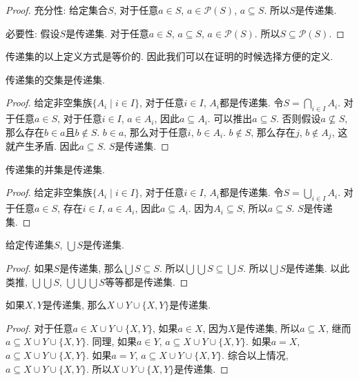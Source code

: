 \begin{proof}
	充分性: 给定集合$S$, 对于任意$a\in S$, $a\in \mathscr P(S)$, $a\subseteq S$. 所以$S$是传递集.
	
	必要性: 假设$S$是传递集. 对于任意$a\in S$, $a\subseteq S$, $a\in \mathscr P(S)$. 所以$S\subseteq \mathscr P(S)$.
\end{proof}

传递集的以上定义方式是等价的. 因此我们可以在证明的时候选择方便的定义.

\begin{proposition}
	传递集的交集是传递集.
\end{proposition}

\begin{proof}
	给定非空集族$\{A_i\mid i\in I\}$, 对于任意$i\in I$, $A_i$都是传递集. 令$S=\bigcap_{i\in I} A_i$. 对于任意$a\in S$, 对于任意$i\in I$, $a\in A_i$, 因此$a\subseteq A_i$. 可以推出$a\subseteq S$. 否则假设$a\nsubseteq S$, 那么存在$b\in a$且$b\notin S$. $b\in a$, 那么对于任意$i$, $b\in A_i$. $b\notin S$, 那么存在$j$, $b\notin A_j$, 这就产生矛盾. 因此$a\subseteq S$. $S$是传递集.
\end{proof}

\begin{proposition}
	传递集的并集是传递集.
\end{proposition}

\begin{proof}
	给定非空集族$\{A_i\mid i\in I\}$, 对于任意$i\in I$, $A_i$都是传递集. 令$S=\bigcup_{i\in I} A_i$. 对于任意$a\in S$, 存在$i\in I$, $a\in A_i$, 因此$a\subseteq A_i$. 因为$A_i\subseteq S$, 所以$a\subseteq S$. $S$是传递集.
\end{proof}

\begin{proposition}
	给定传递集$S$, $\bigcup S$是传递集.
\end{proposition}

\begin{proof}
	如果$S$是传递集, 那么$\bigcup S\subseteq S$. 所以$\bigcup \bigcup S\subseteq \bigcup S$. 所以$\bigcup S$是传递集. 以此类推, $\bigcup \bigcup S$, $\bigcup \bigcup \bigcup S$等等都是传递集.
\end{proof}

\begin{proposition}
	如果$X,Y$是传递集, 那么$X\cup Y \cup\{X,Y\}$是传递集.
\end{proposition}

\begin{proof}
	对于任意$a\in X\cup Y \cup\{X,Y\}$, 如果$a\in X$, 因为$X$是传递集, 所以$a\subseteq X$, 继而$a\subseteq X\cup Y \cup\{X,Y\}$. 同理, 如果$a\in Y$, $a\subseteq X\cup Y \cup\{X,Y\}$. 如果$a=X$, $a\subseteq X\cup Y \cup\{X,Y\}$. 如果$a=Y$, $a\subseteq X\cup Y \cup\{X,Y\}$. 综合以上情况, $a\subseteq X\cup Y \cup\{X,Y\}$. 所以$X\cup Y \cup\{X,Y\}$是传递集.
\end{proof}

